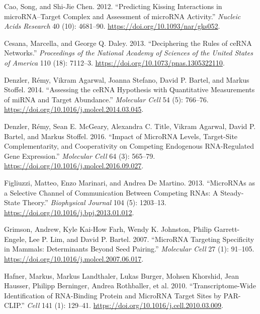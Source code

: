 \documentclass[]{article}
\begin{document}
\leavevmode\hypertarget{ref-cao_predicting_2012}{}%
Cao, Song, and Shi-Jie Chen. 2012. ``Predicting Kissing Interactions in
microRNA--Target Complex and Assessment of microRNA Activity.''
\emph{Nucleic Acids Research} 40 (10): 4681--90.
\url{https://doi.org/10.1093/nar/gks052}.

\leavevmode\hypertarget{ref-cesana_deciphering_2013}{}%
Cesana, Marcella, and George Q. Daley. 2013. ``Deciphering the Rules of
ceRNA Networks.'' \emph{Proceedings of the National Academy of Sciences
of the United States of America} 110 (18): 7112--3.
\url{https://doi.org/10.1073/pnas.1305322110}.

\leavevmode\hypertarget{ref-denzler_assessing_2014}{}%
Denzler, Rémy, Vikram Agarwal, Joanna Stefano, David P. Bartel, and
Markus Stoffel. 2014. ``Assessing the ceRNA Hypothesis with Quantitative
Measurements of miRNA and Target Abundance.'' \emph{Molecular Cell} 54
(5): 766--76. \url{https://doi.org/10.1016/j.molcel.2014.03.045}.

\leavevmode\hypertarget{ref-denzler_impact_2016}{}%
Denzler, Rémy, Sean E. McGeary, Alexandra C. Title, Vikram Agarwal,
David P. Bartel, and Markus Stoffel. 2016. ``Impact of MicroRNA Levels,
Target-Site Complementarity, and Cooperativity on Competing Endogenous
RNA-Regulated Gene Expression.'' \emph{Molecular Cell} 64 (3): 565--79.
\url{https://doi.org/10.1016/j.molcel.2016.09.027}.

\leavevmode\hypertarget{ref-figliuzzi_micrornas_2013}{}%
Figliuzzi, Matteo, Enzo Marinari, and Andrea De Martino. 2013.
``MicroRNAs as a Selective Channel of Communication Between Competing
RNAs: A Steady-State Theory.'' \emph{Biophysical Journal} 104 (5):
1203--13. \url{https://doi.org/10.1016/j.bpj.2013.01.012}.

\leavevmode\hypertarget{ref-grimson_microrna_2007}{}%
Grimson, Andrew, Kyle Kai-How Farh, Wendy K. Johnston, Philip
Garrett-Engele, Lee P. Lim, and David P. Bartel. 2007. ``MicroRNA
Targeting Specificity in Mammals: Determinants Beyond Seed Pairing.''
\emph{Molecular Cell} 27 (1): 91--105.
\url{https://doi.org/10.1016/j.molcel.2007.06.017}.

\leavevmode\hypertarget{ref-hafner_transcriptome-wide_2010}{}%
Hafner, Markus, Markus Landthaler, Lukas Burger, Mohsen Khorshid, Jean
Hausser, Philipp Berninger, Andrea Rothballer, et al. 2010.
``Transcriptome-Wide Identification of RNA-Binding Protein and MicroRNA
Target Sites by PAR-CLIP.'' \emph{Cell} 141 (1): 129--41.
\url{https://doi.org/10.1016/j.cell.2010.03.009}.
\end{document}
